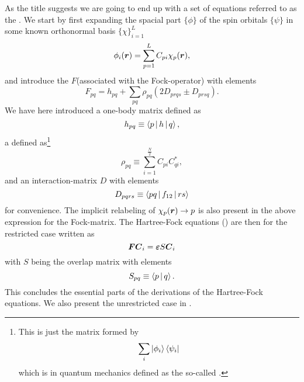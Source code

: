         As the title suggests we are going to end up with a set of equations
        referred to as the . We start by first
        expanding the spacial part $\{\phi\}$ of the spin orbitals $\{\psi\}$
        in some known orthonormal basis $\{\chi\}^L_{i=1}$
            \begin{equation}
                \phi_i(\boldsymbol{{r}}) = \sum\limits^L_{p=1} C_{pi}\chi_p(\boldsymbol{{r}}),
                \label{eq:HFexpansiondephi}
            \end{equation}
        and introduce the  $F$(associated with the
        Fock-operator) with elements
            \begin{equation}
                F_{pq} = h_{pq} + \sum_{pq}\rho_{pq}\left(2D_{prqs} \pm
                D_{prsq}\right).
                \label{eq:FockRestrictedDef}
            \end{equation}
        We have here introduced a one-body matrix defined as
            \begin{equation}
                h_{pq} \equiv \Braket{p | h | q},
            \end{equation}
        a  defined
        as\footnote{This is just the matrix formed by \begin{equation}
        \sum_i\ket{\phi_i}\bra{\psi_i}\end{equation} which is in quantum
        mechanics defined as the so-called .}
            \begin{equation}
                \rho_{pq} \equiv \sum\limits^{\frac{N}{2}}_{i=1}
                C_{pi}C^{*}_{qi},
                \label{eq:densitymatrixdef}
            \end{equation}
        and an interaction-matrix $D$ with elements
            \begin{equation}
                D_{pqrs} \equiv \Braket{pq | f_{12} | rs}
            \end{equation}
        for convenience. The implicit relabeling of $\chi_p(\boldsymbol{{r}})\rightarrow p$
        is also present in the above expression for the Fock-matrix. The
        Hartree-Fock equations () are then for the
        restricted case written as
            \begin{equation}
                \boldsymbol{{F}}\boldsymbol{{C}}_i = \boldsymbol{{\varepsilon}}S\boldsymbol{{C}}_i
                \label{eq:eigvalrestr}
            \end{equation}
        with $S$ being the overlap matrix with elements
            \begin{equation}
                S_{pq} \equiv \Braket{p | q}.
            \end{equation}
        This concludes the essential parts of the derivations of the
        Hartree-Fock equations. We also present the unrestricted case in
        . 
    
